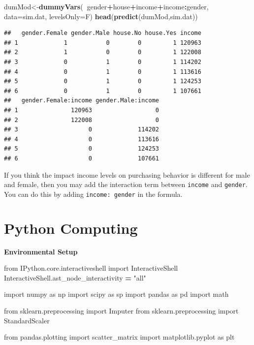 \documentclass[12pt,]{krantz}
\newenvironment{Shaded}{\begin{snugshade}}{\end{snugshade}}
\newcommand{\KeywordTok}[1]{\textcolor[rgb]{0.13,0.29,0.53}{\textbf{#1}}}
\newcommand{\DataTypeTok}[1]{\textcolor[rgb]{0.13,0.29,0.53}{#1}}
\newcommand{\StringTok}[1]{\textcolor[rgb]{0.31,0.60,0.02}{#1}}
\newcommand{\ImportTok}[1]{#1}
\newcommand{\OperatorTok}[1]{\textcolor[rgb]{0.81,0.36,0.00}{\textbf{#1}}}
\newcommand{\NormalTok}[1]{#1}
\theoremstyle{definition}
\theoremstyle{definition}
\theoremstyle{definition}
\theoremstyle{remark}
\begin{document}
\begin{Shaded}
\begin{Highlighting}[]
\NormalTok{dumMod<-}\KeywordTok{dummyVars}\NormalTok{(}\OperatorTok{~}\NormalTok{gender}\OperatorTok{+}\NormalTok{house}\OperatorTok{+}\NormalTok{income}\OperatorTok{+}\NormalTok{income}\OperatorTok{:}\NormalTok{gender,}
                  \DataTypeTok{data=}\NormalTok{sim.dat,}
                  \DataTypeTok{levelsOnly=}\NormalTok{F)}
\KeywordTok{head}\NormalTok{(}\KeywordTok{predict}\NormalTok{(dumMod,sim.dat))}
\end{Highlighting}
\end{Shaded}

\begin{verbatim}
##   gender.Female gender.Male house.No house.Yes income
## 1             1           0        0         1 120963
## 2             1           0        0         1 122008
## 3             0           1        0         1 114202
## 4             0           1        0         1 113616
## 5             0           1        0         1 124253
## 6             0           1        0         1 107661
##   gender.Female:income gender.Male:income
## 1               120963                  0
## 2               122008                  0
## 3                    0             114202
## 4                    0             113616
## 5                    0             124253
## 6                    0             107661
\end{verbatim}

If you think the impact income levels on purchasing behavior is
different for male and female, then you may add the interaction term
between \texttt{income} and \texttt{gender}. You can do this by adding
\texttt{income:\ gender} in the formula.

\section{Python Computing}\label{python-computing}

\textbf{Environmental Setup}

\begin{Shaded}
\begin{Highlighting}[]
\ImportTok{from}\NormalTok{ IPython.core.interactiveshell }\ImportTok{import}\NormalTok{ InteractiveShell}
\NormalTok{InteractiveShell.ast_node_interactivity }\OperatorTok{=} \StringTok{"all"}

\ImportTok{import}\NormalTok{ numpy }\ImportTok{as}\NormalTok{ np}
\ImportTok{import}\NormalTok{ scipy }\ImportTok{as}\NormalTok{ sp}
\ImportTok{import}\NormalTok{ pandas }\ImportTok{as}\NormalTok{ pd}
\ImportTok{import}\NormalTok{ math}

\ImportTok{from}\NormalTok{ sklearn.preprocessing }\ImportTok{import}\NormalTok{ Imputer}
\ImportTok{from}\NormalTok{ sklearn.preprocessing }\ImportTok{import}\NormalTok{ StandardScaler}

\ImportTok{from}\NormalTok{ pandas.plotting }\ImportTok{import}\NormalTok{ scatter_matrix}
\ImportTok{import}\NormalTok{ matplotlib.pyplot }\ImportTok{as}\NormalTok{ plt}
\end{Highlighting}
\end{Shaded}
\end{document}
